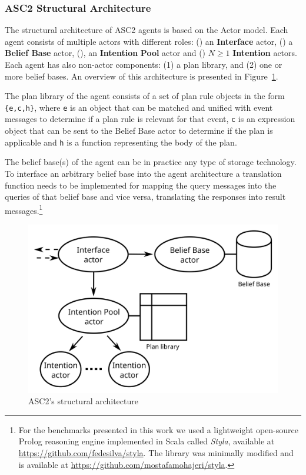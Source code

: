 \subsubsection*{ASC2 Structural Architecture}
The structural architecture of ASC2 agents is based on the Actor model. Each agent consists of multiple actors with different roles: () an \textbf{Interface} actor, () a \textbf{Belief Base} actor, (), an \textbf{Intention} \textbf{Pool} actor and () $N \ge 1$ \textbf{Intention} actors. Each agent has also non-actor components: (1) a plan library, and (2) one or more belief bases. An overview of this architecture is presented in Figure~\ref{fig:asc2arch}.

The plan library of the agent consists of a set of plan rule objects in the form \verb+{e,c,h}+, where \verb+e+ is an object that can be matched and unified with event messages to determine if a plan rule is relevant for that event, \verb+c+ is an expression object that can be sent to the Belief Base actor to determine if the plan is applicable and \verb+h+ is a function representing the body of the plan.

The belief base(s) of the agent can be in practice any type of storage technology. To interface an arbitrary belief base into the agent architecture a translation function needs to be implemented for mapping the query messages into the queries of that belief base and vice versa, translating the responses into result messages.\footnote{For the benchmarks presented in this work we used a lightweight open-source Prolog reasoning engine implemented in Scala called \textit{Styla}, available at \url{https://github.com/fedesilva/styla}. %
The library was minimally modified and is available at \url{https://github.com/mostafamohajeri/styla}.}

\begin{figure}[t!]
  \centering
  \includegraphics[width=0.70\linewidth]{ch2/arch3.png}
  \caption{ASC2's structural architecture}
  \label{fig:asc2arch}
\end{figure}

